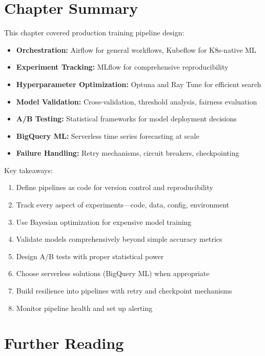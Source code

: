 \section{Chapter Summary}

This chapter covered production training pipeline design:

\begin{itemize}
    \item \textbf{Orchestration:} Airflow for general workflows, Kubeflow for K8s-native ML
    \item \textbf{Experiment Tracking:} MLflow for comprehensive reproducibility
    \item \textbf{Hyperparameter Optimization:} Optuna and Ray Tune for efficient search
    \item \textbf{Model Validation:} Cross-validation, threshold analysis, fairness evaluation
    \item \textbf{A/B Testing:} Statistical frameworks for model deployment decisions
    \item \textbf{BigQuery ML:} Serverless time series forecasting at scale
    \item \textbf{Failure Handling:} Retry mechanisms, circuit breakers, checkpointing
\end{itemize}

Key takeaways:

\begin{enumerate}
    \item Define pipelines as code for version control and reproducibility
    \item Track every aspect of experiments—code, data, config, environment
    \item Use Bayesian optimization for expensive model training
    \item Validate models comprehensively beyond simple accuracy metrics
    \item Design A/B tests with proper statistical power
    \item Choose serverless solutions (BigQuery ML) when appropriate
    \item Build resilience into pipelines with retry and checkpoint mechanisms
    \item Monitor pipeline health and set up alerting
\end{enumerate}

\section{Further Reading}


